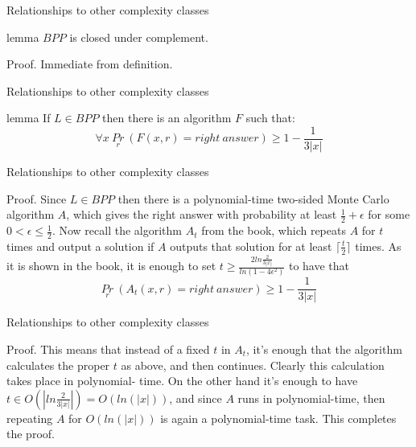         \begin{frame}{Relationships to other complexity classes}
            \begin{block}{lemma}
                $BPP$ is closed under complement.
            \end{block}
            \begin{block}{Proof.}
                Immediate from definition.
            \end{block}
        \end{frame}

        \begin{frame}{Relationships to other complexity classes}
            \begin{block}{lemma}
                If $L \in BPP$ then there is an algorithm $F$ such that:
                $$\forall x \ 
                    \underset{r}{Pr}\ (F(x,r) = right\ answer) 
                    \geq 1-\frac{1}{3|x|}$$
            \end{block}
        \end{frame}

        \begin{frame}{Relationships to other complexity classes}
            \begin{block}{Proof.}
                Since $L \in BPP$ then there is a polynomial-time two-sided 
                Monte Carlo algorithm $A$, which gives the right answer
                with probability at least $\frac{1}{2}+\epsilon$ for some 
                $ 0 < \epsilon \leq \frac{1}{2}$. Now recall the algorithm 
                $A_t$ from the book, which repeats $A$ for $t$ times and 
                output a solution if $A$ outputs that solution for at least
                $\lceil \frac{t}{2} \rceil$ times. As it is shown in the
                book, it is enough to set $t \geq 
                \frac{2ln \frac{2}{3|x|}}{ln(1-4 \epsilon^2)}$
                 to have that
                $$ \underset{r}{Pr}\ (A_t(x,r) = right\ answer) 
                    \geq 1-\frac{1}{3|x|}$$
            \end{block}
        \end{frame}

        \begin{frame}{Relationships to other complexity classes}
            \begin{block}{Proof.}
                This means that instead of a fixed $t$ in $A_t$, it's enough 
                that the algorithm calculates the proper $t$ as above, and then 
                continues. Clearly this calculation takes place in polynomial-
                time. On the other hand it's enough to have 
                $t \in O(|ln\frac{2}{3|x|}|) = O(ln(|x|))$, and 
                since $A$ runs in polynomial-time, then repeating $A$ for 
                $O(ln(|x|))$ is again a polynomial-time task. This completes
                the proof.
            \end{block}
        \end{frame}

